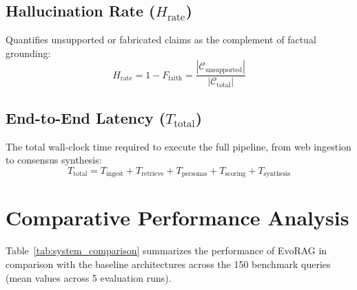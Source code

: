 \subsection{Hallucination Rate ($H_{\text{rate}}$)}
Quantifies unsupported or fabricated claims as the complement of factual grounding:
\begin{equation}
\label{eq:hallucination}
H_{\text{rate}} = 1 - F_{\text{faith}} = \frac{|\mathcal{C}_{\text{unsupported}}|}{|\mathcal{C}_{\text{total}}|}
\end{equation}

\subsection{End-to-End Latency ($T_{\text{total}}$)}
The total wall-clock time required to execute the full pipeline, from web ingestion to consensus synthesis:
\begin{equation}
\label{eq:latency}
T_{\text{total}} = T_{\text{ingest}} + T_{\text{retrieve}} + T_{\text{personas}} + T_{\text{scoring}} + T_{\text{synthesis}}
\end{equation}

\section{Comparative Performance Analysis}
\label{sec:comparative_analysis}

Table~\ref{tab:system_comparison} summarizes the performance of EvoRAG in comparison with the baseline architectures across the 150 benchmark queries (mean values across 5 evaluation runs).

